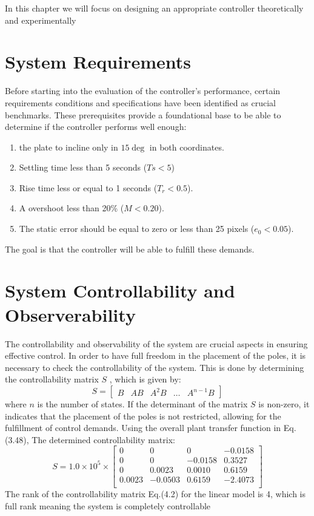 \graphicspath{ {Figures/chapter04} }
In this chapter we will focus on designing an appropriate controller theoretically and experimentally 
\section{System Requirements}
Before starting into the evaluation of the controller's performance, certain requirements conditions and specifications have been identified as crucial benchmarks. These prerequisites provide a foundational base  to be able to determine if the controller performs well enough:

\begin{enumerate}
\item the plate to incline only in \(15\deg\) in both coordinates.
\item Settling time less than 5 seconds (\(Ts < 5\))
\item Rise time less or equal to 1 seconds (\(T_r < 0.5\)).
\item A overshoot less than 20\% (\(M < 0.20\)).
\item The static error should be equal to zero or less than 25 pixels (\(e_0 < 0.05\)).
\end{enumerate}
The goal is that the controller will be able to fulfill these demands.

\section{System Controllability and Observerability}
The controllability and observability of the system are crucial aspects in ensuring effective control. In order to have full freedom in the placement of the poles, it is necessary to check the controllability of the system. This is done by determining the controllability matrix $S$ \cite{nise2020control}, which is given by:
\begin{equation}
S = \begin{bmatrix}
B & AB & A^2B & \dots & A^{n-1}B
\end{bmatrix}
\end{equation}
where $n$ is the number of states. If the determinant of the matrix $S$ is non-zero, it indicates that the placement of the poles is not restricted, allowing for the fulfillment of control demands.
Using the overall plant transfer function in Eq. (3.48), The determined controllability matrix:
\begin{equation}
   S = 1.0 \times 10^5 \times
    \begin{bmatrix}
        0 & 0 & 0 & -0.0158 \\
        0 & 0 & -0.0158 & 0.3527 \\
        0 & 0.0023 & 0.0010 & 0.6159 \\
        0.0023 & -0.0503 & 0.6159 & -2.4073 \\
    \end{bmatrix} 
\end{equation}
The rank of the controllability matrix Eq.(4.2) for the linear model is 4, which is full rank meaning the system is completely controllable


